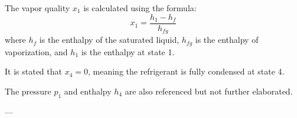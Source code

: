 The vapor quality \( x_1 \) is calculated using the formula:  
\[
x_1 = \frac{h_1 - h_f}{h_{fg}}
\]  
where \( h_f \) is the enthalpy of the saturated liquid, \( h_{fg} \) is the enthalpy of vaporization, and \( h_1 \) is the enthalpy at state 1.  

It is stated that \( x_4 = 0 \), meaning the refrigerant is fully condensed at state 4.  

The pressure \( p_1 \) and enthalpy \( h_4 \) are also referenced but not further elaborated.

---